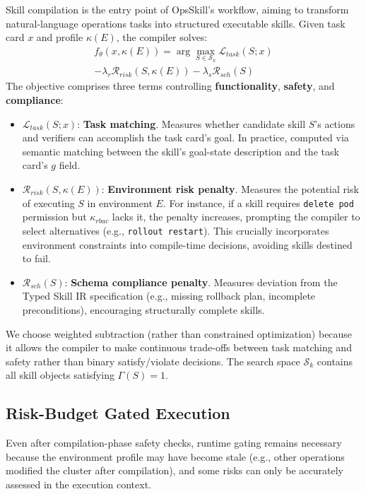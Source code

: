 \documentclass[conference,10pt]{IEEEtran}
\begin{document}
Skill compilation is the entry point of OpsSkill's workflow, aiming to transform natural-language operations tasks into structured executable skills.
Given task card $x$ and profile $\kappa(E)$, the compiler solves:
\begin{multline}
f_\theta(x, \kappa(E)) = \arg\max_{S \in \mathcal{S}_k} \mathcal{L}_{task}(S;x) \\
 - \lambda_r \mathcal{R}_{risk}(S,\kappa(E)) - \lambda_s \mathcal{R}_{sch}(S)
\end{multline}
The objective comprises three terms controlling \textbf{functionality}, \textbf{safety}, and \textbf{compliance}:
\begin{itemize}
  \item $\mathcal{L}_{task}(S; x)$: \textbf{Task matching}.  Measures whether candidate skill $S$'s actions and verifiers can accomplish the task card's goal.  In practice, computed via semantic matching between the skill's goal-state description and the task card's $g$ field.
  \item $\mathcal{R}_{risk}(S, \kappa(E))$: \textbf{Environment risk penalty}.  Measures the potential risk of executing $S$ in environment $E$.  For instance, if a skill requires \texttt{delete pod} permission but $\kappa_{rbac}$ lacks it, the penalty increases, prompting the compiler to select alternatives (e.g., \texttt{rollout restart}).  This crucially incorporates environment constraints into compile-time decisions, avoiding skills destined to fail.
  \item $\mathcal{R}_{sch}(S)$: \textbf{Schema compliance penalty}.  Measures deviation from the Typed Skill IR specification (e.g., missing rollback plan, incomplete preconditions), encouraging structurally complete skills.
\end{itemize}
We choose weighted subtraction (rather than constrained optimization) because it allows the compiler to make continuous trade-offs between task matching and safety rather than binary satisfy/violate decisions.
The search space $\mathcal{S}_k$ contains all skill objects satisfying $\Gamma(S)=1$.

\subsection{Risk-Budget Gated Execution}

Even after compilation-phase safety checks, runtime gating remains necessary because the environment profile may have become stale (e.g., other operations modified the cluster after compilation), and some risks can only be accurately assessed in the execution context.
\end{document}
